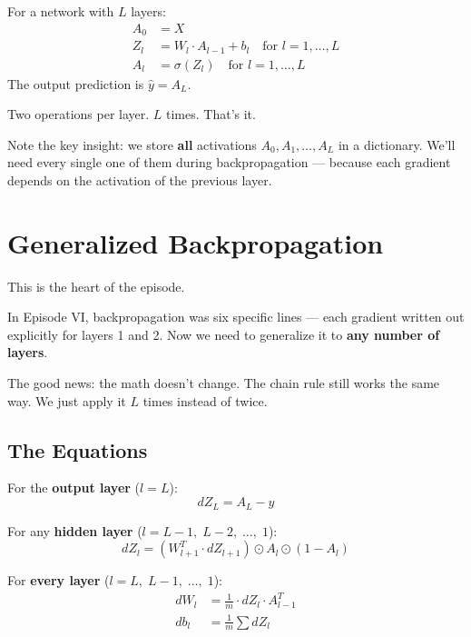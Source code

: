 \documentclass[11pt]{article}
\begin{document}
\begin{defbox}[title=Forward Propagation --- General Form]
For a network with $L$ layers:
\begin{align}
A_0 &= X \\
Z_l &= W_l \cdot A_{l-1} + b_l \quad \text{for } l = 1, \dots, L \\
A_l &= \sigma(Z_l) \quad \text{for } l = 1, \dots, L
\end{align}
The output prediction is $\hat{y} = A_L$.

Two operations per layer. $L$ times. That's it.
\end{defbox}

Note the key insight: we store \textbf{all} activations $A_0, A_1, \ldots, A_L$ in a dictionary. We'll need every single one of them during backpropagation --- because each gradient depends on the activation of the previous layer.


\section{Generalized Backpropagation}

This is the heart of the episode.

In Episode VI, backpropagation was six specific lines --- each gradient written out explicitly for layers 1 and 2. Now we need to generalize it to \textbf{any number of layers}.

The good news: the math doesn't change. The chain rule still works the same way. We just apply it $L$ times instead of twice.

\subsection{The Equations}

\begin{defbox}[title=Generalized Backpropagation Equations]
For the \textbf{output layer} ($l = L$):
$$dZ_L = A_L - y$$

For any \textbf{hidden layer} ($l = L-1, \; L-2, \; \ldots, \; 1$):
$$dZ_l = \left(W_{l+1}^T \cdot dZ_{l+1}\right) \odot A_l \odot (1 - A_l)$$

For \textbf{every layer} ($l = L, \; L-1, \; \ldots, \; 1$):
\begin{align}
dW_l &= \frac{1}{m} \cdot dZ_l \cdot A_{l-1}^T \\[0.3em]
db_l &= \frac{1}{m} \sum dZ_l
\end{align}
\end{defbox}
\end{document}
